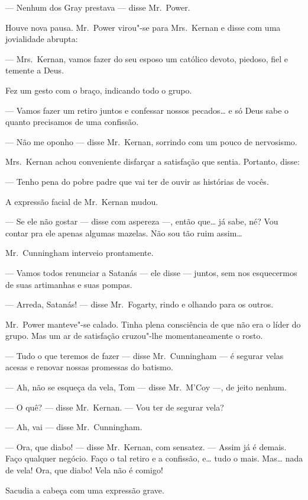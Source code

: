 --- Nenhum dos Gray prestava --- disse Mr.~Power.  

Houve nova pausa.  Mr.~Power virou"-se para Mrs.~Kernan e disse com uma
jovialidade abrupta:

--- Mrs.~Kernan, vamos fazer do seu esposo um católico devoto, piedoso, fiel e
temente a Deus.

Fez um gesto com o braço, indicando todo o grupo.

--- Vamos fazer um retiro juntos e confessar nossos pecados\ldots{} e só Deus
sabe o quanto precisamos de uma confissão.

--- Não me oponho --- disse Mr.~Kernan, sorrindo com um pouco de nervosismo.

Mrs.~Kernan achou conveniente disfarçar a satisfação que sentia.  Portanto,
disse:

--- Tenho pena do pobre padre que vai ter de ouvir as histórias de vocês.

A expressão facial de Mr.~Kernan mudou.

--- Se ele não gostar --- disse com aspereza ---, então que\ldots{} já sabe,
né?  Vou contar pra ele apenas algumas mazelas.  Não sou tão ruim assim\ldots{}

Mr.~Cunningham interveio prontamente.

--- Vamos todos renunciar a Satanás --- ele disse --- juntos, sem nos
esquecermos de suas artimanhas e suas pompas.

--- Arreda, Satanás! --- disse Mr.~Fogarty, rindo e olhando para os outros.

Mr.~Power manteve"-se calado.  Tinha plena consciência de que não era o líder do
grupo.  Mas um ar de satisfação cruzou"-lhe momentaneamente o rosto.

--- Tudo o que teremos de fazer --- disse Mr.~Cunningham --- é segurar velas
acesas e renovar nossas promessas do batismo.

--- Ah, não se esqueça da vela, Tom --- disse Mr.~M’Coy ---, de jeito nenhum.

--- O quê? --- disse Mr.~Kernan.  --- Vou ter de segurar vela?

--- Ah, vai --- disse Mr.~Cunningham.

--- Ora, que diabo! --- disse Mr.~Kernan, com sensatez.  --- Assim já é demais.
Faço qualquer negócio.  Faço o tal retiro e a confissão, e\ldots{} tudo o mais.
Mas\ldots{} nada de vela!  Ora, que diabo!  Vela não é comigo!

Sacudia a cabeça com uma expressão grave.

